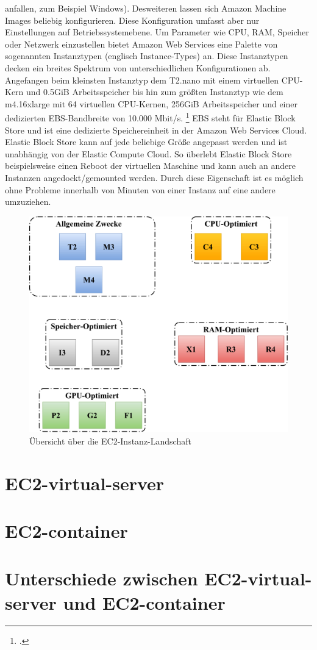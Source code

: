 \documentclass[titlepage]{report}
\begin{document}
anfallen, zum Beispiel Windows). Desweiteren lassen sich Amazon Machine
Images beliebig konfigurieren. Diese Konfiguration umfasst aber nur
Einstellungen auf Betriebssystemebene. Um Parameter wie CPU, RAM,
Speicher oder Netzwerk einzustellen bietet Amazon Web Services eine
Palette von sogenannten Instanztypen (englisch Instance-Types) an.
Diese Instanztypen decken ein breites Spektrum von unterschiedlichen
Konfigurationen ab. Angefangen beim kleinsten Instanztyp dem T2.nano mit
einem virtuellen CPU-Kern und 0.5GiB Arbeitsspeicher bis hin zum größten
Instanztyp wie dem m4.16xlarge mit 64 virtuellen CPU-Kernen, 256GiB
Arbeitsspeicher und einer dedizierten EBS-Bandbreite von 10.000 Mbit/s.
\footcite{Incd} EBS steht für Elastic Block Store und ist eine
dedizierte Speichereinheit in der Amazon Web Services Cloud. Elastic
Block Store kann auf jede beliebige Größe angepasst werden und ist
unabhängig von der Elastic Compute Cloud. So überlebt Elastic Block
Store beispielsweise einen Reboot der virtuellen Maschine und kann auch
an andere Instanzen angedockt/gemounted werden. Durch diese Eigenschaft
ist es möglich ohne Probleme innerhalb von Minuten von einer Instanz auf eine andere
umzuziehen.
\begin{figure}
    \centering
    \includegraphics[width=1.0\textwidth]{figures/EC2-Landscape.pdf}
    \caption{Übersicht über die EC2-Instanz-Landschaft}\label{fig:1}
\end{figure}


\section{EC2-virtual-server}
\section{EC2-container}
\section{Unterschiede zwischen EC2-virtual-server und EC2-container}
\nocite{*}
\printbibliography
\listoffigures
\end{document}

